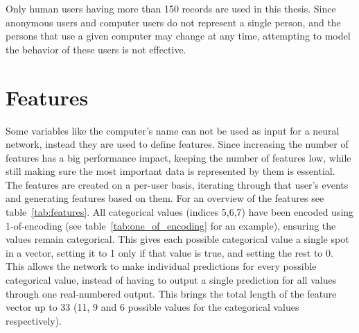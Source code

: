\begin{table}[htbp]
	\centering
	\caption{The data set structure}\label{tab:data}
\end{table}

Only human users having more than 150 records are used in this thesis. Since anonymous users and computer users do not represent a single person, and the persons that use a given computer may change at any time, attempting to model the behavior of these users is not effective.

\section{Features}
Some variables like the computer's name can not be used as input for a neural network, instead they are used to define features. Since increasing the number of features has a big performance impact, keeping the number of features low, while still making sure the most important data is represented by them is essential. The features are created on a per-user basis, iterating through that user's events and generating features based on them. For an overview of the features see table~\ref{tab:features}. All categorical values (indices 5,6,7) have been encoded using 1-of-encoding (see table~\ref{tab:one_of_encoding} for an example), ensuring the values remain categorical. This gives each possible categorical value a single spot in a vector, setting it to 1 only if that value is true, and setting the rest to 0. This allows the network to make individual predictions for every possible categorical value, instead of having to output a single prediction for all values through one real-numbered output. This brings the total length of the feature vector up to 33 (11, 9 and 6 possible values for the categorical values respectively).


